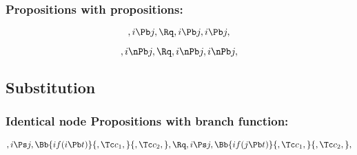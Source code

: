 \bigskip
\bigskip
\bigskip
\bigskip
\subsubsection{Propositions with propositions:}
\[,i \Pb j, \Rq , i \Pb j, i \Pb j,\]

\[,i \nPb j, \Rq , i \nPb j, i \nPb j,\]




\bigskip
\bigskip
\bigskip
\bigskip
\subsection{ Substitution}
\subsubsection{Identical node Propositions with branch function:}
\[,i \Ps j, \Bb{if(i \Pb t)}{,\Tc c_1,}{,\Tc c_2,}, \Rq ,i \Ps j, \Bb{if(j \Pb t)}{,\Tc c_1,}{,\Tc c_2,}, \]

